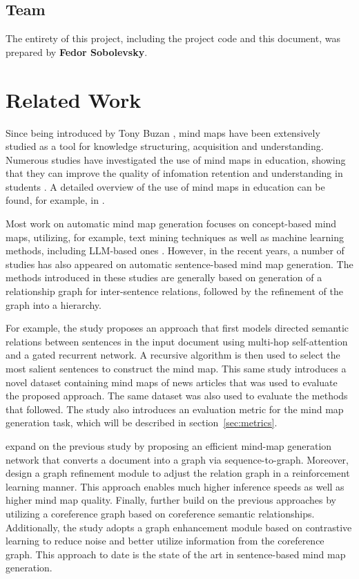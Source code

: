 \documentclass{article}
\begin{document}
\subsection{Team}
The entirety of this project, including the project code and this document, was prepared by \textbf{Fedor Sobolevsky}.



\section{Related Work}
\label{sec:related}
Since being introduced by Tony Buzan \cite{buzan2006use}, mind maps have been extensively studied as a tool for knowledge structuring, acquisition and understanding. Numerous studies have investigated the use of mind maps in education, showing that they can improve the quality of infomation retention and understanding in students \cite{guerrero2015mind, tungprapa2015effect, rezapour2019mind}. A detailed overview of the use of mind maps in education can be found, for example, in \cite{mitra2023tradition}.

Most work on automatic mind map generation focuses on concept-based mind maps, utilizing, for example, text mining techniques \cite{abdeen2009direct, elhoseiny2012english2mindmap, lu2023weakly} as well as machine learning methods, including LLM-based ones \cite{jain2024structsum, vijaykumar2026text}. However, in the recent years, a number of studies has also appeared on automatic sentence-based mind map generation. The methods introduced in these studies are generally based on generation of a relationship graph for inter-sentence relations, followed by the refinement of the graph into a hierarchy.

For example, the study \cite{wei2019revealing} proposes an approach that first models directed semantic relations between sentences in the input document using multi-hop self-attention and a gated recurrent network. A recursive algorithm is then used to select the most salient sentences to construct the mind map. This same study introduces a novel dataset containing mind maps of news articles that was used to evaluate the proposed approach. The same dataset was also used to evaluate the methods that followed. The study \cite{wei2019revealing} also introduces an evaluation metric for the mind map generation task, which will be described in section~\ref{sec:metrics}.

\cite{hu2021efficient} expand on the previous study by proposing an efficient mind-map generation network that converts a document into a graph via sequence-to-graph. Moreover, \cite{hu2021efficient} design a graph refinement module
to adjust the relation graph in a reinforcement learning manner. This approach enables much higher inference speeds as well as higher mind map quality. Finally, \cite{zhang2024coreference} further build on the previous approaches by utilizing a coreference graph based on coreference semantic relationships. Additionally, the study adopts a graph enhancement module based on contrastive learning to reduce noise and better utilize information from the coreference graph. This approach to date is the state of the art in sentence-based mind map generation. 
\end{document}
